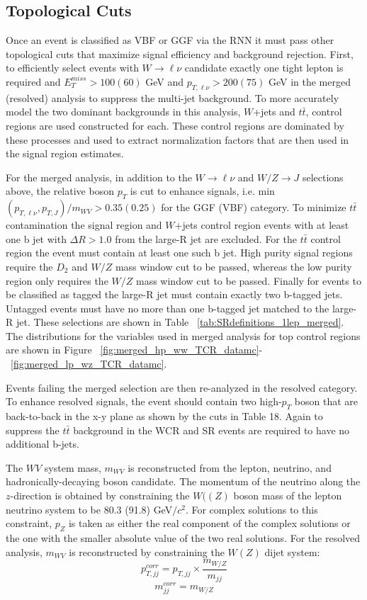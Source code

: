 \subsection{Topological Cuts}
Once an event is classified as VBF or GGF via the RNN it must pass other topological cuts that maximize signal efficiency and background rejection. First, to efficiently select events with $W\rightarrow \ell \nu$ candidate exactly one tight lepton is required and $E_{T}^{miss} > 100(60)$ GeV and $p_{T,\ell\nu} > 200(75)$ GeV in the merged (resolved) analysis to suppress the multi-jet background. To more accurately model the two dominant backgrounds in this analysis, $W$+jets and $t\bar{t}$, control regions are used constructed for each. These control regions are dominated by these processes and used to extract normalization factors that are then used in the signal region estimates.

For the merged analysis, in addition to the $W \rightarrow \ell \nu$ and $W/Z \rightarrow J$ selections above, the relative boson $p_{T}$ is cut to enhance signals, i.e. min$(p_{T, \ell \nu}, p_{T,J})/m_{WV} > 0.35(0.25)$ for the GGF (VBF) category. To minimize $t\bar{t}$ contamination the signal region and $W$+jets control region events with at least one b jet with $\Delta R > 1.0$ from the large-R jet are excluded. For the $t\bar{t}$ control region the event must contain at least one such b jet. High purity signal regions require the $D_{2}$ and $W/Z$ mass window cut to be passed, whereas the low purity region only requires the  $W/Z$ mass window cut to be passed. Finally for events to be classified as tagged the large-R jet must contain exactly two b-tagged jets. Untagged events must have no more than one b-tagged jet matched to the large-R jet. These selections are shown in Table ~\ref{tab:SRdefinitions_1lep_merged}. The distributions for the variables used in merged analysis for top control regions are shown in Figure ~\ref{fig:merged_hp_ww_TCR_datamc}-~\ref{fig:merged_lp_wz_TCR_datamc}.

Events failing the merged selection are then re-analyzed in the resolved category. To enhance resolved signals, the event should contain two high-$p_{T}$ boson that are back-to-back in the x-y plane as shown by the cuts in Table 18. Again to suppress the $t\bar{t}$ background in the WCR and SR events are required to have no additional b-jets. 

The $WV$ system mass, $m_{WV}$ is reconstructed from the lepton, neutrino, and hadronically-decaying boson candidate. The momentum of the neutrino along the $z$-direction is obtained by constraining the $W((Z)$ boson mass of the lepton neutrino system to be  80.3 (91.8) GeV$/c^{2}$. For complex solutions to this constraint, $p_{Z}$ is taken as either the real component of the complex solutions or the one with the smaller absolute value of the two real solutions. For the resolved analysis, $m_{WV}$ is reconstructed by constraining the $W(Z)$ dijet system:
\begin{equation}
p^{corr}_{T,jj} = p_{T,jj} \times \frac{m_{W/Z}}{m_{jj}}
\end{equation}
\begin{equation}
m^{corr}_{jj}=m_{W/Z}
\end{equation}

